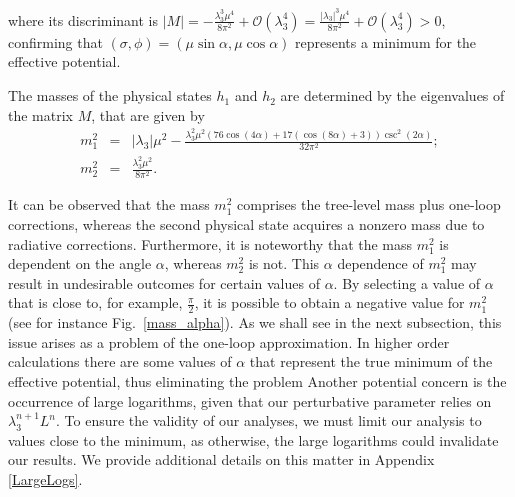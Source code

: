\documentclass[11pt,a4paper,english,superscriptaddress,preprint,aps,prd]{revtex4}
\begin{document}
where its discriminant is $|M|=-\frac{\lambda_3^3\mu^4}{8\pi^2}+\mathcal{O}(\lambda_3^4)=\frac{|\lambda_3|^3\mu^4}{8\pi^2}+\mathcal{O}(\lambda_3^4)>0$, confirming that $(\sigma,\phi)=(\mu\sin\alpha,\mu\cos\alpha)$ represents a minimum for the effective potential. 

The masses of the physical states $h_1$ and $h_2$ are determined by the eigenvalues of the matrix $M$, that are given by
\begin{subequations}
 \begin{eqnarray}
  m_{1}^2 &=& |\lambda_3| \mu ^2-\frac{\lambda_3^2 \mu ^2 (76 \cos (4 \alpha )+17 (\cos (8 \alpha )+3)) \csc ^2(2 \alpha )}{32 \pi ^2};\\
 m_{2}^2 &=& \frac{\lambda_3^2 \mu ^2}{8 \pi ^2}.
 \end{eqnarray}
\end{subequations}

It can be observed that the mass $m_1^2$ comprises the tree-level mass plus one-loop corrections, whereas the second physical state acquires a nonzero mass due to radiative corrections. Furthermore, it is noteworthy that the mass $m_1^2$ is dependent on the angle $\alpha$, whereas $m_2^2$ is not. This $\alpha$ dependence of $m_1^2$ may result in undesirable outcomes for certain values of $\alpha$. By selecting a value of $\alpha$ that is close to, for example, $\frac{\pi}{2}$, it is possible to obtain a negative value for $m_1^2$ (see for instance Fig.~\ref{mass_alpha}). As we shall see in the next subsection, this issue arises as a problem of the one-loop approximation. In higher order calculations there are some values of $\alpha$ that represent the true minimum of the effective potential, thus eliminating the problem {Another potential concern is the occurrence of large logarithms, given that our perturbative parameter relies on $\lambda_3^{n+1}L^n$. To ensure the validity of our analyses, we must limit our analysis to values close to the minimum, as otherwise, the large logarithms could invalidate our results. We provide additional details on this matter in Appendix \ref{LargeLogs}.}
\end{document}
